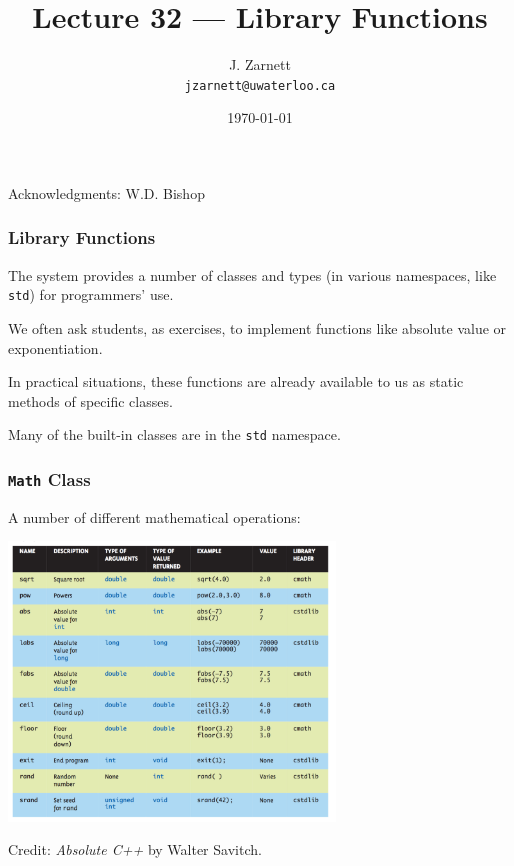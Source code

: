 

\title{Lecture 32 --- Library Functions }

\author{J. Zarnett\\
\texttt{jzarnett@uwaterloo.ca}}
\date{\today}



\begin{frame}
  \titlepage
  
  \begin{center}
  \small{Acknowledgments: W.D. Bishop}
  \end{center}
\end{frame}


\begin{frame}
\frametitle{Library Functions}
The system provides a number of classes and types (in various namespaces, like \texttt{std}) for programmers' use.

We often ask students, as exercises, to implement functions like absolute value or exponentiation.

In practical situations, these functions are already available to us as static methods of specific classes.

Many of the built-in classes are in the \texttt{std} namespace.

\end{frame}

\begin{frame}
\frametitle{\texttt{Math} Class}
A number of different mathematical operations:

\begin{center}
\includegraphics[width=0.65\textwidth]{images/math.png}
\end{center}

Credit: \textit{Absolute C++} by Walter Savitch.


\end{frame}

